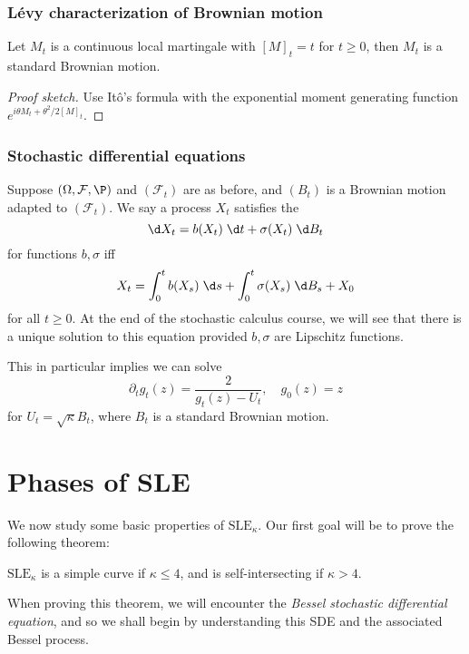 \documentclass[a4paper]{article}
\newcommand\SLE{\mathrm{SLE}}
\begin{document}
\subsubsection*{L\'evy characterization of Brownian motion}
\begin{thm}
  Let $M_t$ is a continuous local martingale with $[M]_t = t$ for $t \geq 0$, then $M_t$ is a standard Brownian motion.
\end{thm}

\begin{proof}[Proof sketch]
  Use It\^o's formula with the exponential moment generating function $e^{i\theta M_t + \theta^2/2 [M]_t}$.
\end{proof}

\subsubsection*{Stochastic differential equations}
Suppose $(\Omega, \mathcal{F}, \P)$ and $(\mathcal{F}_t)$ are as before, and $(B_t)$ is a Brownian motion adapted to $(\mathcal{F}_t)$. We say a process $X_t$ satisfies the 
\[
  \d X_t = b(X_t) \;\d t + \sigma(X_t) \;\d B_t
\]
for functions $b, \sigma$ iff
\[
  X_t = \int_0^t b(X_s) \;\d s + \int_0^t \sigma(X_s) \;\d B_s + X_0
\]
for all $t \geq 0$. At the end of the stochastic calculus course, we will see that there is a unique solution to this equation provided $b, \sigma$ are Lipschitz functions.

This in particular implies we can solve
\[
  \partial_t g_t(z) = \frac{2}{g_t(z) - U_t},\quad g_0(z) = z
\]
for $U_t = \sqrt{\kappa} B_t$, where $B_t$ is a standard Brownian motion.

\section{Phases of SLE}
We now study some basic properties of $\SLE_\kappa$. Our first goal will be to prove the following theorem:
\begin{thm}
  $\SLE_\kappa$ is a simple curve if $\kappa \leq 4$, and is self-intersecting if $\kappa > 4$.
\end{thm}

When proving this theorem, we will encounter the \emph{Bessel stochastic differential equation}, and so we shall begin by understanding this SDE and the associated Bessel process.
\end{document}
